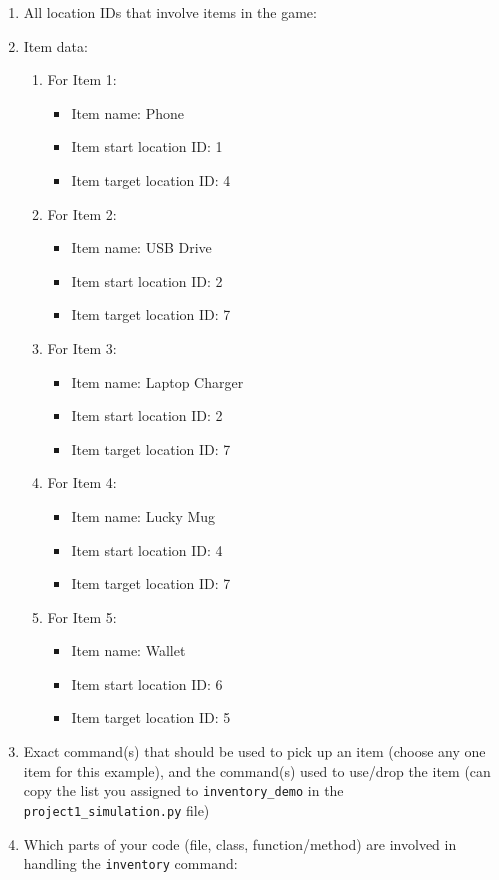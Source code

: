 \documentclass[11pt]{article}
\begin{document}
\begin{enumerate}
\item All location IDs that involve items in the game:

\item Item data:
\begin{enumerate}
    \item For Item 1:
    \begin{itemize}
    \item Item name: Phone
    \item Item start location ID: 1
    \item Item target location ID: 4
    \end{itemize}
        \item For Item 2:
    \begin{itemize}
    \item Item name: USB Drive
    \item Item start location ID: 2
    \item Item target location ID: 7
    \end{itemize}
        \item For Item 3:
    \begin{itemize}
    \item Item name: Laptop Charger
    \item Item start location ID: 2
    \item Item target location ID: 7
    \end{itemize}
        \item For Item 4:
    \begin{itemize}
    \item Item name: Lucky Mug
    \item Item start location ID: 4
    \item Item target location ID: 7
    \end{itemize}
        \item For Item 5:
    \begin{itemize}
    \item Item name: Wallet
    \item Item start location ID: 6
    \item Item target location ID: 5
    \end{itemize}
\end{enumerate}

    \item Exact command(s) that should be used to pick up an item (choose any one item for this example), and the command(s) used to use/drop the item (can copy the list you assigned to \texttt{inventory\_demo} in the \texttt{project1\_simulation.py} file)
    \item Which parts of your code (file, class, function/method) are involved in handling the \texttt{inventory} command:
\end{enumerate}
\end{document}
